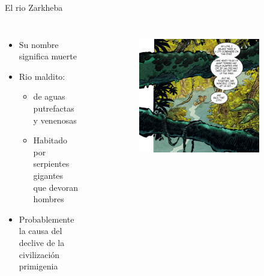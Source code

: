 \begin{frame}{El rio Zarkheba}
	\begin{columns}
		\begin{itemize}
			\item Su nombre significa muerte
			\item Rio maldito:
			\begin{itemize}
				\item de aguas putrefactas y venenosas
				\item Habitado por serpientes gigantes que devoran hombres
			\end{itemize}
			\item Probablemente la causa del declive de la civilización primigenia
		\end{itemize}
		\begin{figure}[htp]
			\centering
			\begin{subfigure}[b]{0.27\textwidth}
				\includegraphics[width=\textwidth]{img/rio/Ablaze}
			\end{subfigure}
			~
			\begin{subfigure}[b]{0.3\textwidth}

\end{subfigure}
\end{figure}
\end{columns}
\end{frame}
